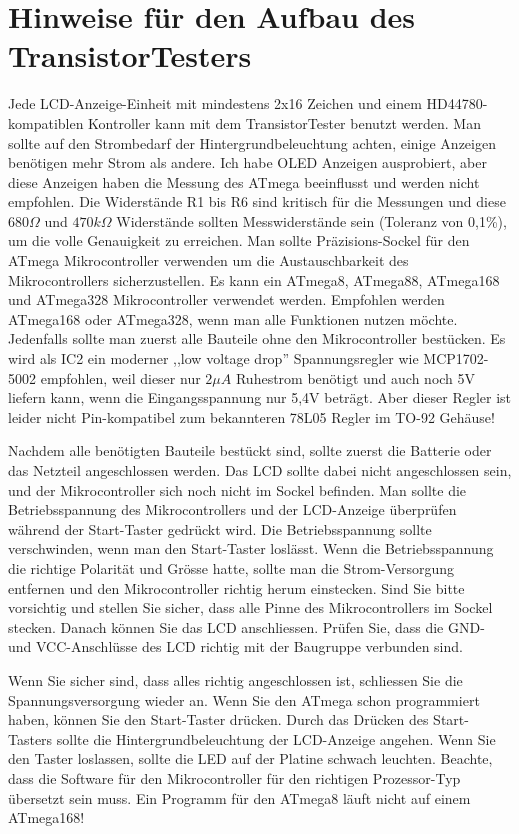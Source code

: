 \section{Hinweise f\"ur den Aufbau des TransistorTesters}
Jede LCD-Anzeige-Einheit mit mindestens 2x16 Zeichen und einem HD44780-kompatiblen Kontroller kann mit
dem TransistorTester benutzt werden.
Man sollte auf den Strombedarf der Hintergrundbeleuchtung achten, einige Anzeigen ben\"otigen
mehr Strom als andere.
Ich habe OLED Anzeigen ausprobiert, aber diese Anzeigen haben die Messung des
ATmega beeinflusst und werden nicht empfohlen.
Die Widerst\"ande R1 bis R6 sind kritisch f\"ur die Messungen und diese \(680\Omega\) und
\(470k\Omega\) Widerst\"ande sollten Messwiderst\"ande sein (Toleranz von 0,1\%), um 
die volle Genauigkeit zu erreichen.
Man sollte Pr\"azisions-Sockel f\"ur den ATmega Mikrocontroller verwenden um
die Austauschbarkeit des Mikrocontrollers sicherzustellen.
Es kann ein ATmega8, ATmega88, ATmega168 und ATmega328 Mikrocontroller verwendet werden.
Empfohlen werden ATmega168 oder ATmega328, wenn man alle Funktionen nutzen m\"ochte.
Jedenfalls sollte man zuerst alle Bauteile ohne den Mikrocontroller best\"ucken.
Es wird als IC2 ein moderner ,,low voltage drop'' Spannungsregler wie MCP1702-5002 empfohlen, weil
dieser nur \(2\mu A\) Ruhestrom ben\"otigt und auch noch 5V liefern kann, 
 wenn die Eingangsspannung nur 5,4V betr\"agt.
Aber dieser Regler ist leider nicht Pin-kompatibel zum bekannteren 78L05 Regler im TO-92 Geh\"ause!

Nachdem alle ben\"otigten Bauteile best\"uckt sind, sollte zuerst die Batterie
oder das Netzteil angeschlossen werden. Das LCD sollte dabei nicht angeschlossen sein, und der Mikrocontroller sich noch nicht im Sockel befinden.
Man sollte die Betriebsspannung des Mikrocontrollers und der LCD-Anzeige
\"uberpr\"ufen w\"ahrend der Start-Taster gedr\"uckt wird.
Die Betriebsspannung sollte verschwinden, wenn man den Start-Taster losl\"asst.
Wenn die Betriebsspannung die richtige Polarit\"at und Gr\"osse hatte,
sollte man die Strom-Versorgung entfernen und den Mikrocontroller 
richtig herum einstecken. Sind Sie bitte vorsichtig und stellen Sie sicher,
dass alle Pinne des Mikrocontrollers im Sockel stecken.
Danach k\"onnen Sie das LCD anschliessen. Pr\"ufen Sie, dass die GND- und VCC-Anschl\"usse des LCD richtig mit der Baugruppe verbunden sind.

Wenn Sie sicher sind, dass alles richtig angeschlossen ist, schliessen Sie
die Spannungsversorgung wieder an.
Wenn Sie den ATmega schon programmiert haben, k\"onnen Sie den Start-Taster
dr\"ucken.
Durch das Dr\"ucken des Start-Tasters sollte die Hintergrundbeleuchtung
der LCD-Anzeige angehen.
Wenn Sie den Taster loslassen, sollte die LED auf der Platine schwach leuchten.
Beachte, dass die Software f\"ur den Mikrocontroller f\"ur den richtigen
Prozessor-Typ \"ubersetzt sein muss. Ein Programm f\"ur den ATmega8 l\"auft
nicht auf einem ATmega168!

